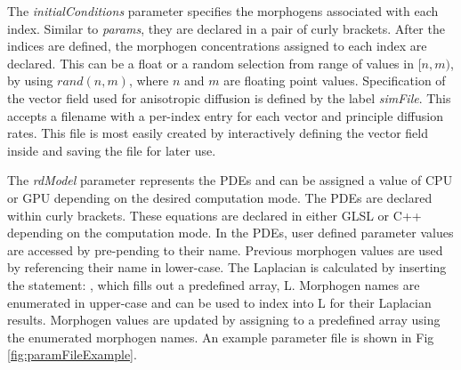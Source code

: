 The \textit{initialConditions} parameter specifies the morphogens associated with each index. Similar to \textit{params}, they are declared in a pair of curly brackets. After the indices are defined, the morphogen concentrations assigned to each index are declared. This can be a float or a random selection from range of values in $[n, m)$, by using $rand(n, m)$, where $n$ and $m$ are floating point values. Specification of the vector field used for anisotropic diffusion is defined by the label \textit{simFile}. This accepts a filename with a per-index entry for each vector and principle diffusion rates. This file is most easily created by interactively defining the vector field inside \ProgramName{} and saving the file for later use.

The \textit{rdModel} parameter represents the PDEs and can be assigned a value of CPU or GPU depending on the desired computation mode. The PDEs are declared within curly brackets. These equations are declared in either GLSL or C++ depending on the computation mode. In the PDEs, user defined parameter values are accessed by pre-pending  to their name. Previous morphogen values are used by referencing their name in lower-case. The Laplacian is calculated by inserting the statement: , which fills out a predefined array, L. Morphogen names are enumerated in upper-case and can be used to index into L for their Laplacian results. Morphogen values are updated by assigning to a predefined  array using the enumerated morphogen names. An example parameter file is shown in Fig \ref{fig:paramFileExample}.

